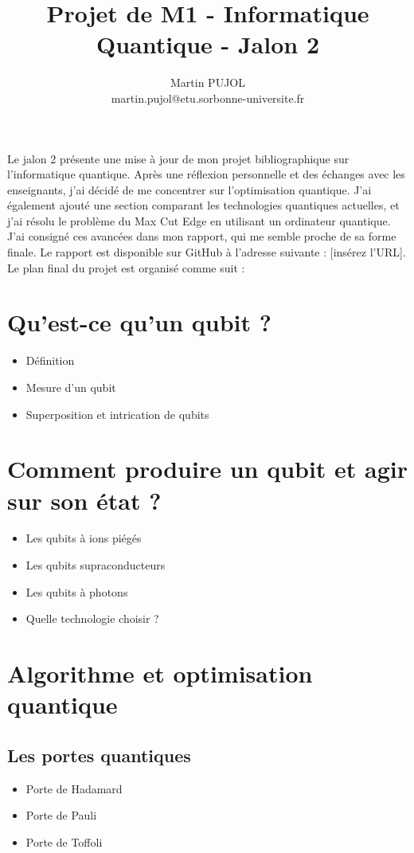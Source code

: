 \documentclass[12pt]{article}
\begin{document}
\title{Projet de M1 - Informatique Quantique - Jalon 2}
\author{Martin PUJOL \\ martin.pujol@etu.sorbonne-universite.fr}
\date{}
\maketitle
Le jalon 2 présente une mise à jour de mon projet bibliographique sur l'informatique quantique. Après une réflexion personnelle et des échanges avec les enseignants, j'ai décidé de me concentrer sur l'optimisation quantique. J'ai également ajouté une section comparant les technologies quantiques actuelles, et j'ai résolu le problème du Max Cut Edge en utilisant un ordinateur quantique. J'ai consigné ces avancées dans mon rapport, qui me semble proche de sa forme finale. Le rapport est disponible sur GitHub à l'adresse suivante : [insérez l'URL].
Le plan final du projet est organisé comme suit :

\section{Qu’est-ce qu’un qubit ?}
\begin{itemize}
    \item Définition
    \item Mesure d’un qubit
    \item Superposition et intrication de qubits
\end{itemize}

\section{Comment produire un qubit et agir sur son état ?}
\begin{itemize}
    \item Les qubits à ions piégés
    \item Les qubits supraconducteurs
    \item Les qubits à photons
    \item Quelle technologie choisir ?
\end{itemize}


\section{Algorithme et optimisation quantique}
\subsection{Les portes quantiques}
\begin{itemize}
    \item Porte de Hadamard
    \item Porte de Pauli
    \item Porte de Toffoli
\end{itemize}
\end{document}
